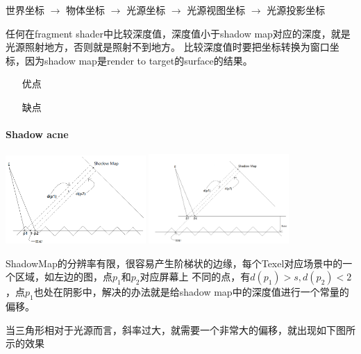 世界坐标 $\rightarrow$ 物体坐标 $\rightarrow$ 光源坐标 $\rightarrow$ 光源视图坐标 $\rightarrow$ 光源投影坐标

任何在fragment shader中比较深度值，深度值小于shadow map对应的深度，就是光源照射地方，否则就是照射不到地方。
比较深度值时要把坐标转换为窗口坐标，因为shadow map是render to target的surface的结果。

\begin{itemize}
    \item [优点] 
    \item [缺点] 
\end{itemize}

\paragraph{Shadow acne}
\begin{center}
    \includegraphics[width=0.4\textwidth]{images/shadow_acne.png}
    \includegraphics[width=0.4\textwidth]{images/shadow_acne_offset.png}
\end{center}
ShadowMap的分辨率有限，很容易产生阶梯状的边缘，每个Texel对应场景中的一个区域，如左边的图，点$p_{1}$和$p_{2}$对应屏幕上
不同的点，有$d(p_{1})>s, d(p_{2})<2$，点$p_{1}$也处在阴影中，解决的办法就是给shadow map中的深度值进行一个常量的偏移。

当三角形相对于光源而言，斜率过大，就需要一个非常大的偏移，就出现如下图所示的效果
